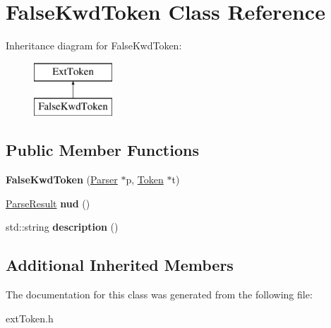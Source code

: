 \hypertarget{class_false_kwd_token}{}\section{False\+Kwd\+Token Class Reference}
\label{class_false_kwd_token}
Inheritance diagram for False\+Kwd\+Token\+:\begin{figure}[H]
\begin{center}
\leavevmode
\includegraphics[height=2.000000cm]{class_false_kwd_token}
\end{center}
\end{figure}
\subsection*{Public Member Functions}
\begin{DoxyCompactItemize}
\item 
\hypertarget{class_false_kwd_token_add6402d29fd7b22253a0dc73370597e4}{}{\bfseries False\+Kwd\+Token} (\hyperlink{class_parser}{Parser} $\ast$p, \hyperlink{class_token}{Token} $\ast$t)\label{class_false_kwd_token_add6402d29fd7b22253a0dc73370597e4}

\item 
\hypertarget{class_false_kwd_token_adc06b0433535d552c1e7f8076d756fb3}{}\hyperlink{class_parse_result}{Parse\+Result} {\bfseries nud} ()\label{class_false_kwd_token_adc06b0433535d552c1e7f8076d756fb3}

\item 
\hypertarget{class_false_kwd_token_a8351fad7090214687138e113b5a581f1}{}std\+::string {\bfseries description} ()\label{class_false_kwd_token_a8351fad7090214687138e113b5a581f1}

\end{DoxyCompactItemize}
\subsection*{Additional Inherited Members}


The documentation for this class was generated from the following file\+:\begin{DoxyCompactItemize}
\item 
ext\+Token.\+h\end{DoxyCompactItemize}
